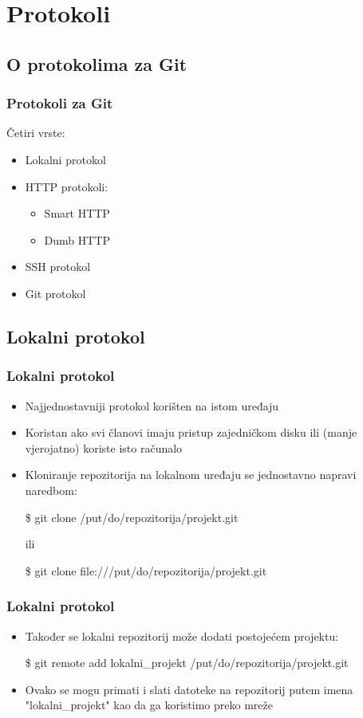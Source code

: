 \newpage

\section{Protokoli}
\subsection{O protokolima za Git}

\begin{frame}
\frametitle{Protokoli za Git}

Četiri vrste:
\begin{itemize}
	\item Lokalni protokol
	\item HTTP protokoli:
	\begin{itemize}
		\item Smart HTTP
		\item Dumb HTTP
	\end{itemize}
	\item SSH protokol
	\item Git protokol
\end{itemize}
\end{frame}


\subsection{Lokalni protokol}

\begin{frame}
\frametitle{Lokalni protokol}
\begin{itemize}
	\item Najjednostavniji protokol korišten na istom uređaju
	\item Koristan ako svi članovi imaju pristup zajedničkom disku ili (manje vjerojatno) koriste isto računalo
	\item Kloniranje repozitorija na lokalnom uređaju se jednostavno napravi naredbom:

	\$ git clone /put/do/repozitorija/projekt.git

	ili

	\$ git clone file:///put/do/repozitorija/projekt.git
\end{itemize}
\end{frame}

\begin{frame}
\frametitle{Lokalni protokol}
\begin{itemize}
	\item Također se lokalni repozitorij može dodati postojećem projektu:

	\$ git remote add lokalni\_projekt /put/do/repozitorija/projekt.git

	\item Ovako se mogu primati i slati datoteke na repozitorij putem imena "lokalni\_projekt" kao da ga koristimo preko mreže
\end{itemize}
\end{frame}